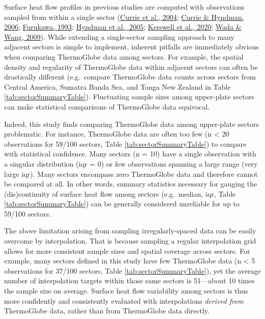 Surface heat flow profiles in previous studies are computed with observations sampled from within a single sector (\protect\hyperlink{ref-currie2004}{Currie et al., 2004}; \protect\hyperlink{ref-currie2006}{Currie \& Hyndman, 2006}; \protect\hyperlink{ref-furukawa1993}{Furukawa, 1993}; \protect\hyperlink{ref-hyndman2005}{Hyndman et al., 2005}; \protect\hyperlink{ref-kerswell2020}{Kerswell et al., 2020}; \protect\hyperlink{ref-wada2009}{Wada \& Wang, 2009}). While extending a single-sector sampling approach to many adjacent sectors is simple to implement, inherent pitfalls are immediately obvious when comparing ThermoGlobe data among sectors. For example, the spatial density and regularity of ThermoGlobe data within adjacent sectors can often be drastically different (e.g.~compare ThermoGlobe data counts across sectors from Central America, Sumatra Banda Sea, and Tonga New Zealand in Table \ref{tab:sectorSummaryTable}). Fluctuating sample sizes among upper-plate sectors can make statistical comparisons of ThermoGlobe data equivocal.

Indeed, this study finds comparing ThermoGlobe data among upper-plate sectors problematic. For instance, ThermoGlobe data are often too few (n \textless{} 20 observations for 59/100 sectors, Table \ref{tab:sectorSummaryTable}) to compare with statistical confidence. Many sectors (n = 10) have a single observation with a singular distribution (\gls{iqr} = 0) or few observations spanning a large range (very large \gls{iqr}). Many sectors encompass zero ThermoGlobe data and therefore cannot be compared at all. In other words, summary statistics necessary for gauging the (dis)continuity of surface heat flow among sectors (e.g.~median, \gls{iqr}, Table \ref{tab:sectorSummaryTable}) can be generally considered unreliable for up to 59/100 sectors.

The above limitation arising from sampling irregularly-spaced data can be easily overcome by interpolation. That is because sampling a regular interpolation grid allows for more consistent sample sizes and spatial coverage across sectors. For example, many sectors defined in this study have few ThermoGlobe data (n \textless{} 5 observations for 37/100 sectors, Table \ref{tab:sectorSummaryTable}), yet the average number of interpolation targets within those same sectors is 51---about 10 times the sample size on average. Surface heat flow variability among sectors is thus more confidently and consistently evaluated with interpolations \emph{derived from} ThermoGlobe data, rather than from ThermoGlobe data directly.


